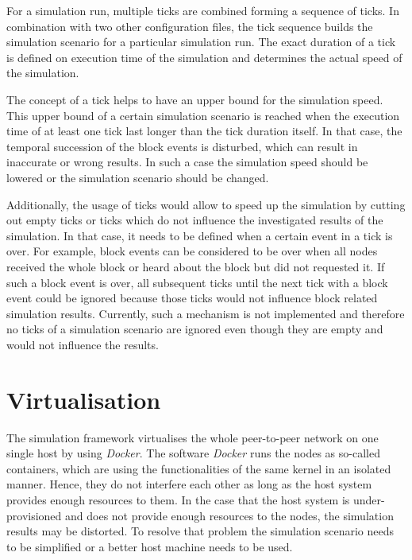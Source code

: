 For a simulation run, multiple ticks are combined forming a sequence of ticks.
In combination with two other configuration files, the tick sequence builds the simulation scenario for a particular simulation run.
The exact duration of a tick is defined on execution time of the simulation and determines the actual speed of the simulation.

The concept of a tick helps to have an upper bound for the simulation speed.
This upper bound of a certain simulation scenario is reached when the execution time of at least one tick last longer than the tick duration itself.
In that case, the temporal succession of the block events is disturbed, which can result in inaccurate or wrong results.
In such a case the simulation speed should be lowered or the simulation scenario should be changed.

Additionally, the usage of ticks would allow to speed up the simulation by cutting out empty ticks or ticks which do not influence the investigated results of the simulation.
In that case, it needs to be defined when a certain event in a tick is over.
For example, block events can be considered to be over when all nodes received the whole block or heard about the block but did not requested it.
If such a block event is over, all subsequent ticks until the next tick with a block event could be ignored because those ticks would not influence block related simulation results.
Currently, such a mechanism is not implemented and therefore no ticks of a simulation scenario are ignored even though they are empty and would not influence the results.


\section{Virtualisation}
\label{chap:virtualisation}

The simulation framework virtualises the whole peer-to-peer network on one single host by using \textit{Docker}.
The software \textit{Docker} runs the nodes as so-called containers, which are using the functionalities of the same kernel in an isolated manner.
Hence, they do not interfere each other as long as the host system provides enough resources to them.
In the case that the host system is under-provisioned and does not provide enough resources to the nodes, the simulation results may be distorted.
To resolve that problem the simulation scenario needs to be simplified or a better host machine needs to be used.

